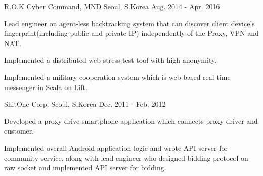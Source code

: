 \begin{cventries}
	{R.O.K Cyber Command, MND} %
	{Seoul, S.Korea} %
	{Aug. 2014 - Apr. 2016} %
	{
		\begin{cvitems} %
			\item {Lead engineer on agent-less backtracking system that can discover client device's fingerprint(including public and private IP) independently of the Proxy, VPN and NAT.}
			\item {Implemented a distributed web stress test tool with high anonymity.}
			\item {Implemented a military cooperation system which is web based real time messenger in Scala on Lift.}
		\end{cvitems}
	}

	{ShitOne Corp.} %
	{Seoul, S.Korea} %
	{Dec. 2011 - Feb. 2012} %
	{
		\begin{cvitems} %
			\item {Developed a proxy drive smartphone application which connects proxy driver and customer.}
			\item {Implemented overall Android application logic and wrote API server for community service, along with lead engineer who designed bidding protocol on raw socket and implemented API server for bidding.}
		\end{cvitems}
	}

\end{cventries}
